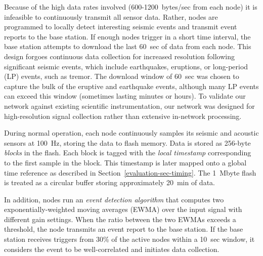 Because of the high data rates involved (600-1200~bytes/sec from each node)
it is infeasible to continuously transmit all sensor data. Rather, nodes are
programmed to locally detect interesting seismic events and transmit event
reports to the base station. If enough nodes trigger in a short time
interval, the base station attempts to download the last 60~sec of data from
each node.  This design forgoes continuous data collection for increased
resolution following significant seismic events, which include earthquakes,
eruptions, or long-period (LP) events, such as tremor.  The download window
of 60~sec was chosen to capture the bulk of the eruptive and earthquake
events, although many LP events can exceed this window (sometimes lasting
minutes or hours).  To validate our network against existing scientific
instrumentation, our network was designed for high-resolution signal
collection rather than extensive in-network processing.

During normal operation, each node continuously samples its seismic and
acoustic sensors at 100~Hz, storing the data to flash memory. Data is stored
as 256-byte {\em blocks} in the flash.
Each block 
is tagged with the {\em local timestamp} corresponding to the first sample in
the block.  This timestamp is later mapped onto a global time reference as
described in Section~\ref{evaluation-sec-timing}. The 1~Mbyte flash is
treated as a circular buffer storing approximately 20~min of data. 

In addition, nodes run an {\em event detection algorithm} that computes two
exponentially-weighted moving averages (EWMA) over the input signal with
different gain settings. When the ratio between the two EWMAs exceeds a
threshold, the node transmits an event report to the base station.
If the base station receives triggers from 30\% of the active nodes within a
10~sec window, it considers the event to be well-correlated and initiates
data collection.


